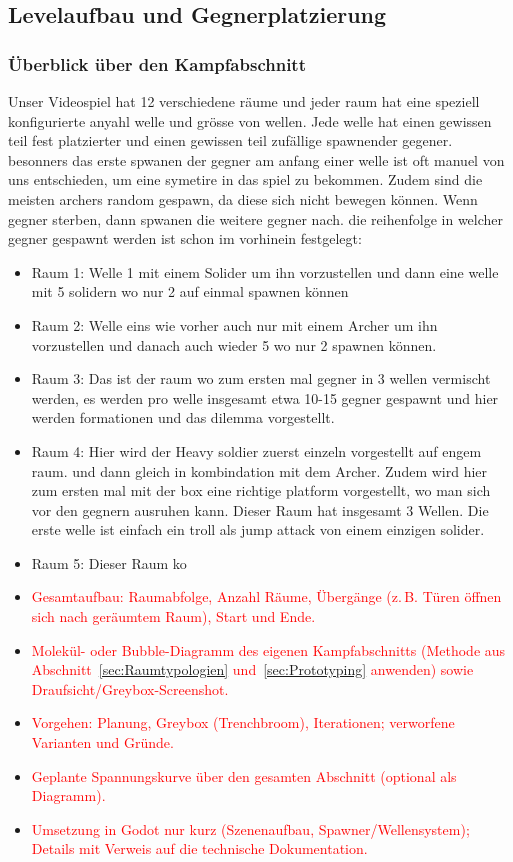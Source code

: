 \documentclass[../Main.tex]{subfiles}
\begin{document}
\subsection{Levelaufbau und Gegnerplatzierung} \label{sec:UmsetzungLevel}

\subsubsection{Überblick über den Kampfabschnitt} \label{sec:Kampfabschnitt}
Unser Videospiel hat 12 verschiedene räume und jeder raum hat eine speziell konfigurierte anyahl welle und grösse von wellen. Jede welle hat einen gewissen teil fest platzierter und einen gewissen teil zufällige spawnender gegener. besonners das erste spwanen der gegner am anfang einer welle ist oft manuel von uns entschieden, um eine symetire in das spiel zu bekommen. Zudem sind die meisten archers random gespawn, da diese sich nicht bewegen können. Wenn gegner sterben, dann spwanen die weitere gegner nach. die reihenfolge in welcher gegner gespawnt werden ist schon im vorhinein festgelegt:
\begin{itemize}
    \item Raum 1: Welle 1 mit einem Solider um ihn vorzustellen und dann eine welle mit 5 solidern wo nur 2 auf einmal spawnen können
    \item Raum 2: Welle eins wie vorher auch nur mit einem Archer um ihn vorzustellen und danach auch wieder 5 wo nur 2 spawnen können.
    \item Raum 3: Das ist der raum wo zum ersten mal gegner in 3 wellen vermischt werden, es werden pro welle insgesamt etwa 10-15 gegner gespawnt und hier werden formationen und das dilemma vorgestellt.
    \item Raum 4: Hier wird der Heavy soldier zuerst einzeln vorgestellt auf engem raum. und dann gleich in kombindation mit dem Archer. Zudem wird hier zum ersten mal mit der box eine richtige platform vorgestellt, wo man sich vor den gegnern ausruhen kann. Dieser Raum hat insgesamt 3 Wellen. Die erste welle ist einfach ein troll als jump attack von einem einzigen solider.
    \item Raum 5: Dieser Raum ko
\end{itemize}
\begin{itemize}[leftmargin=1.5cm]
    \item \textcolor{red}{Gesamtaufbau: Raumabfolge, Anzahl Räume, Übergänge (z.\,B. Türen öffnen sich nach geräumtem Raum), Start und Ende.}
    \item \textcolor{red}{Molekül- oder Bubble-Diagramm des eigenen Kampfabschnitts (Methode aus Abschnitt~\ref{sec:Raumtypologien} und~\ref{sec:Prototyping} anwenden) sowie Draufsicht/Greybox-Screenshot.}
    \item \textcolor{red}{Vorgehen: Planung, Greybox (Trenchbroom), Iterationen; verworfene Varianten und Gründe.}
    \item \textcolor{red}{Geplante Spannungskurve über den gesamten Abschnitt (optional als Diagramm).}
    \item \textcolor{red}{Umsetzung in Godot nur kurz (Szenenaufbau, Spawner/Wellensystem); Details mit Verweis auf die technische Dokumentation.}
\end{itemize}
\end{document}
